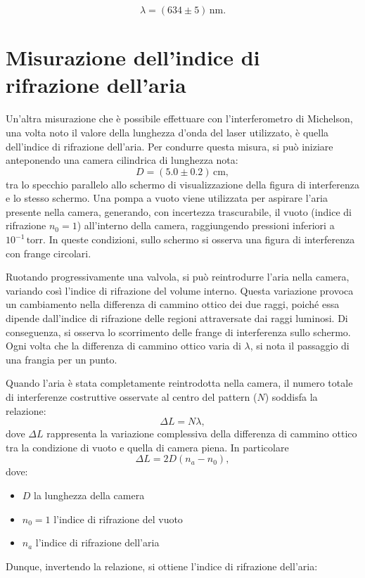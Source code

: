 \documentclass[a4paper,12pt]{article}
\begin{document}
\begin{equation}
    \lambda = (634 \pm 5) \, \text{nm}.
    \label{eq:valore_lambda_2}
    \end{equation}

\section{Misurazione dell’indice di rifrazione dell’aria}

Un’altra misurazione che è possibile effettuare con l’interferometro di Michelson, una volta noto il valore della lunghezza d’onda del laser utilizzato, è quella dell’indice di rifrazione dell’aria.
Per condurre questa misura, si può iniziare anteponendo una camera cilindrica di lunghezza nota:
\[
D = (5.0 \pm 0.2) \, \text{cm},
\]
tra lo specchio parallelo allo schermo di visualizzazione della figura di interferenza e lo stesso schermo. Una pompa a vuoto viene utilizzata per aspirare l’aria presente nella camera, generando, con incertezza trascurabile, il vuoto (indice di rifrazione \(n_0 = 1\)) all’interno della camera, raggiungendo pressioni inferiori a \(10^{-1} \, \text{torr}\). In queste condizioni, sullo schermo si osserva una figura di interferenza con frange circolari.

Ruotando progressivamente una valvola, si può reintrodurre l’aria nella camera, variando così l’indice di rifrazione del volume interno. Questa variazione provoca un cambiamento nella differenza di cammino ottico dei due raggi, poiché essa dipende dall’indice di rifrazione delle regioni attraversate dai raggi luminosi. Di conseguenza, si osserva lo scorrimento delle frange di interferenza sullo schermo. Ogni volta che la differenza di cammino ottico varia di \( \lambda \), si nota il passaggio di una frangia per un punto.

Quando l’aria è stata completamente reintrodotta nella camera, il numero totale di interferenze costruttive osservate al centro del pattern (\(N\)) soddisfa la relazione:
\begin{equation}
\Delta L = N\lambda,
\label{eq:delta_cammino_ottico}
\end{equation}
dove \( \Delta L \) rappresenta la variazione complessiva della differenza di cammino ottico tra la condizione di vuoto e quella di camera piena. In particolare
\[
\Delta L = 2D (n_a - n_0),
\]
dove:
\begin{itemize}
    \item \( D \) la lunghezza della camera
    \item \( n_0 = 1 \) l'indice di rifrazione del vuoto
    \item \( n_a \) l'indice di rifrazione dell’aria
\end{itemize}
Dunque, invertendo la relazione, si ottiene l’indice di rifrazione dell’aria:
\end{document}
